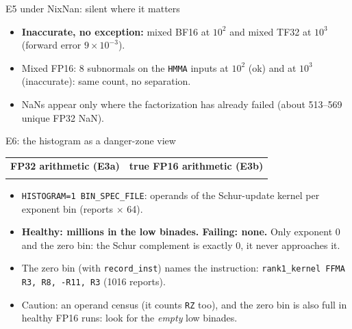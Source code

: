 \documentclass[aspectratio=169,10pt,xcolor=table]{beamer}
\begin{document}
\begin{frame}{E5 under NixNan: silent where it matters}
\centering\fontsize{6.5}{8}\selectfont


\vspace{2mm}\raggedright\footnotesize
\begin{itemize}
\item \textbf{Inaccurate, no exception:} mixed BF16 at $10^{2}$ and mixed TF32 at $10^{3}$ (forward error $9\times10^{-3}$).
\item Mixed FP16: 8 subnormals on the \texttt{HMMA} inputs at $10^{2}$ (ok) and at $10^{3}$ (inaccurate): same count, no separation.
\item NaNs appear only where the factorization has already failed (about 513--569 unique FP32 NaN).
\end{itemize}
\end{frame}

\begin{frame}{E6: the histogram as a danger-zone view}
\centering\scriptsize
\begin{tabular}{cc}
\textbf{FP32 arithmetic (E3a)} & \textbf{true FP16 arithmetic (E3b)}\\[1mm]
 & 
\end{tabular}

\vspace{1mm}\raggedright\footnotesize
\begin{itemize}
\item \texttt{HISTOGRAM=1 BIN\_SPEC\_FILE}: operands of the Schur-update kernel per exponent bin (reports $\times$ 64).
\item \textbf{Healthy: millions in the low binades. Failing: none.} Only exponent 0 and the zero bin: the Schur complement is exactly $0$, it never approaches it.
\item The zero bin (with \texttt{record\_inst}) names the instruction: \texttt{rank1\_kernel FFMA R3, R8, -R11, R3} (1016 reports).
\item Caution: an operand census (it counts \texttt{RZ} too), and the zero bin is also full in healthy FP16 runs: look for the \emph{empty} low binades.
\end{itemize}
\end{frame}
\end{document}
